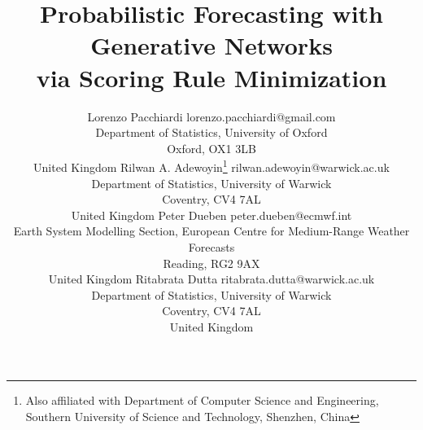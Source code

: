 \documentclass[twoside,11pt]{article}
\begin{document}
	
	\title{Probabilistic Forecasting with Generative Networks\\via Scoring Rule Minimization}
	
	\author{\name Lorenzo Pacchiardi \email lorenzo.pacchiardi@gmail.com\\
		\addr Department of Statistics,
		University of Oxford \\
		Oxford, OX1 3LB \\
		United Kingdom
		\AND
		\name Rilwan A. Adewoyin\thanks{Also affiliated with Department of Computer Science and Engineering, Southern University of Science	and Technology, Shenzhen, China} \email rilwan.adewoyin@warwick.ac.uk \\
		\addr Department of Statistics,
		University of Warwick \\
		Coventry, CV4 7AL\\
		United Kingdom 
		\AND
		\name Peter Dueben \email peter.dueben@ecmwf.int \\
		\addr Earth System Modelling Section,
		European Centre for Medium-Range Weather Forecasts \\
		Reading, RG2 9AX\\
		United Kingdom 
		\AND
		\name Ritabrata Dutta \email ritabrata.dutta@warwick.ac.uk \\
		\addr Department of Statistics, 
		University of Warwick \\
		Coventry, CV4 7AL\\
		United Kingdom }
	
	
	
	\maketitle
	
\end{document}
